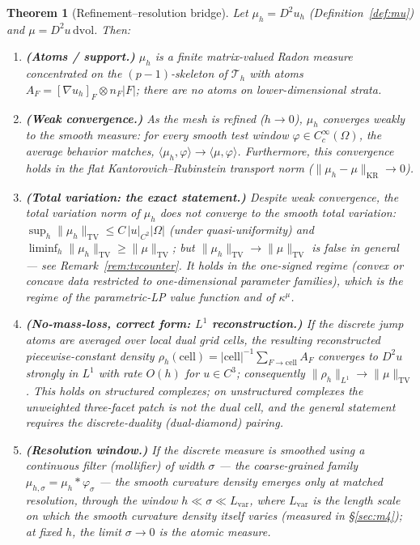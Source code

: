 \documentclass[11pt,a4paper]{article}
\theoremstyle{plain}
\newtheorem{theorem}{Theorem}[section]
\theoremstyle{definition}
\theoremstyle{remark}
\newcommand{\kmu}{\kappa^{\mu}}
\newcommand{\TV}{\mathrm{TV}}
\newcommand{\dvol}{\,\mathrm{dvol}}
\DeclareMathOperator{\KR}{KR}
\begin{document}
\begin{theorem}[Refinement--resolution bridge]
\label{thm:Bprime}
Let $\mu_h = D^2 u_h$ (Definition~\ref{def:mu}) and
$\mu = D^2u \dvol$. Then:
\begin{enumerate}[label=(\roman*),leftmargin=2em]
\item \textbf{(Atoms / support.)} $\mu_h$ is a finite matrix-valued Radon
      measure concentrated on the $(p-1)$-skeleton of $\mathcal{T}_h$ with
      atoms $A_F = [\nabla u_h]_F \otimes n_F |F|$; there are no atoms on
      lower-dimensional strata.
\item \textbf{(Weak convergence.)} As the mesh is refined ($h \to 0$),
      $\mu_h$ converges weakly to the smooth measure: for every
      smooth test window $\varphi \in C_c^\infty(\Omega)$, the average
      behavior matches, $\langle \mu_h, \varphi \rangle \to
      \langle \mu, \varphi \rangle$. Furthermore, this convergence
      holds in the flat Kantorovich--Rubinstein transport norm
      ($\|\mu_h - \mu\|_{\KR} \to 0$).
\item \textbf{(Total variation: the exact statement.)} Despite weak
      convergence, the total variation norm of $\mu_h$ does
      \emph{not} converge to the smooth total variation:
      $\sup_h \|\mu_h\|_{\TV} \le C\,|u|_{C^2}|\Omega|$ (under
      quasi-uniformity) and
      $\liminf_h \|\mu_h\|_{\TV} \ge \|\mu\|_{\TV}$; but
      $\|\mu_h\|_{\TV} \to \|\mu\|_{\TV}$ is false in general ---
      see Remark~\ref{rem:tvcounter}. It holds in the one-signed regime
      (convex or concave data restricted to one-dimensional parameter
      families), which is the regime of the parametric-LP value function
      and of $\kmu$.
\item \textbf{(No-mass-loss, correct form: $L^1$ reconstruction.)}
      If the discrete jump atoms are averaged over local dual grid
      cells, the resulting reconstructed piecewise-constant density
      $\rho_h(\mathrm{cell}) = |\mathrm{cell}|^{-1} \sum_{F \to
      \mathrm{cell}} A_F$ converges to $D^2 u$ \emph{strongly in $L^1$}
      with rate $O(h)$ for $u \in C^3$; consequently
      $\|\rho_h\|_{L^1} \to \|\mu\|_{\TV}$. This holds on structured
      complexes; on unstructured complexes the
      unweighted three-facet patch is not the dual cell, and the general
      statement requires the discrete-duality (dual-diamond) pairing.
\item \textbf{(Resolution window.)} If the discrete measure is
      smoothed using a continuous filter (mollifier) of width
      $\sigma$ --- the coarse-grained family $\mu_{h,\sigma} =
      \mu_h * \varphi_\sigma$ --- the smooth curvature density
      emerges only at matched resolution, through the
      window $h \ll \sigma \ll L_{\mathrm{var}}$, where $L_{\mathrm{var}}$
      is the length scale on which the smooth curvature density itself
      varies (measured in \S\ref{sec:m4}); at fixed $h$, the limit
      $\sigma \to 0$ is the \emph{atomic} measure.
\end{enumerate}
\end{theorem}
\end{document}
